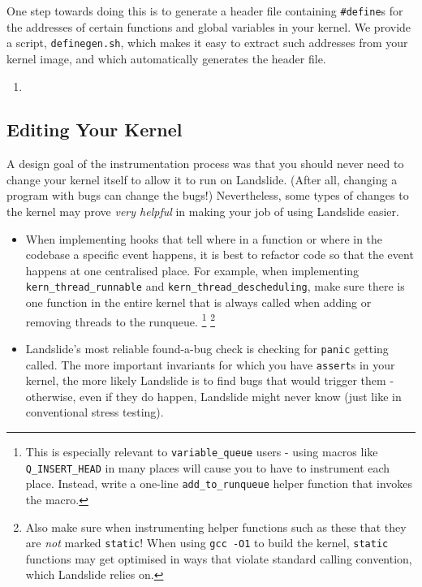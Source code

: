 \documentclass{article}
\begin{document}
One step towards doing this is to generate a header file containing \texttt{\#define}s for the addresses of certain functions and global variables in your kernel.
We provide a script, \texttt{definegen.sh}, which makes it easy to extract such addresses from your kernel image, and which automatically generates the header file.

\begin{enumerate}
	\item
\end{enumerate}

\subsection{Editing Your Kernel}

A design goal of the instrumentation process was that you should never need to change your kernel itself to allow it to run on Landslide. (After all, changing a program with bugs can change the bugs!)
Nevertheless, some types of changes to the kernel may prove {\em very helpful} in making your job of using Landslide easier.

\begin{itemize}
	\item When implementing hooks that tell where in a function or where in the codebase a specific event happens, it is best to refactor code so that the event happens at one centralised place.
		For example, when implementing \texttt{kern\_thread\_runnable} and \texttt{kern\_thread\_descheduling}, make sure there is one function in the entire kernel that is always called when adding or removing threads to the runqueue.
		\footnote{This is especially relevant to \texttt{variable\_queue} users - using macros like \texttt{Q\_INSERT\_HEAD} in many places will cause you to have to instrument each place. Instead, write a one-line \texttt{add\_to\_runqueue} helper function that invokes the macro.}
		\footnote{Also make sure when instrumenting helper functions such as these that they are {\em not} marked \texttt{static}! When using \texttt{gcc -O1} to build the kernel, \texttt{static} functions may get optimised in ways that violate standard calling convention, which Landslide relies on.}
	\item Landslide's most reliable found-a-bug check is checking for \texttt{panic} getting called.
		The more important invariants for which you have \texttt{assert}s in your kernel, the more likely Landslide is to find bugs that would trigger them - otherwise, even if they do happen, Landslide might never know (just like in conventional stress testing).
\end{itemize}
\end{document}
